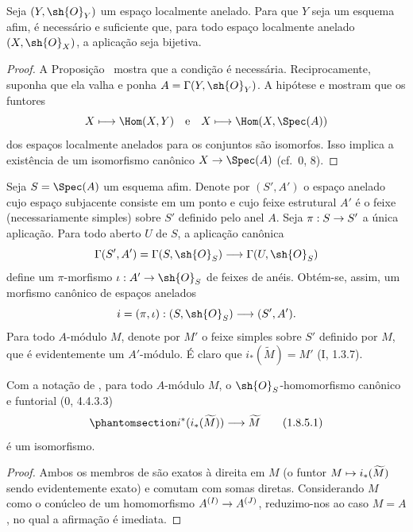 \documentclass[oneside,10pt]{amsart}
\makeatletter
\newcommand{\ega@arrow}[2]{\mathchoice{#1}{#2}{#2}{#2}}
\let\ega@shortmapsto\mapsto
\renewcommand{\to}{\ega@arrow{\longrightarrow}{\rightarrow}}
\renewcommand{\mapsto}{\ega@arrow{\longmapsto}{\ega@shortmapsto}}
\let\EGAOriginalLabel\label
\renewcommand{\label}[1]{\phantomsection\EGAOriginalLabel{#1}}
\makeatother
\begin{document}
\begin{corollary}[1.8.3]
\label{ega2:addendum:I.1.8.3}
Seja $(Y,\sh{O}_Y)$ um espaço localmente anelado. Para que $Y$ seja um
esquema afim, é necessário e suficiente que, para todo espaço
localmente anelado $(X,\sh{O}_X)$, a aplicação  seja
bijetiva.
\end{corollary}

\begin{proof}
A Proposição~ mostra que a condição é necessária.
Reciprocamente, suponha que ela valha e ponha $A=\Gamma(Y,\sh{O}_Y)$.
A hipótese e  mostram que os funtores
\[
  X\longmapsto\Hom(X,Y)
  \quad\hbox{e}\quad
  X\longmapsto\Hom(X,\Spec(A))
\]
dos espaços localmente anelados para os conjuntos são isomorfos. Isso
implica a existência de um isomorfismo canônico
$X\to\Spec(A)$ (cf.~0, 8).
\end{proof}

\begin{env}[1.8.4]
\label{ega2:addendum:I.1.8.4}
Seja $S=\Spec(A)$ um esquema afim. Denote por $(S',A')$ o espaço
anelado cujo espaço subjacente consiste em um ponto e cujo feixe
estrutural $A'$ é o feixe (necessariamente simples) sobre $S'$ definido
pelo anel $A$. Seja $\pi:S\to S'$ a única aplicação. Para todo aberto
$U$ de $S$, a aplicação canônica
\[
  \Gamma(S',A')=\Gamma(S,\sh{O}_S)\to\Gamma(U,\sh{O}_S)
\]
define um $\pi$-morfismo $\iota:A'\to\sh{O}_S$ de feixes de anéis.
Obtém-se, assim, um morfismo canônico de espaços anelados
\[
  i=(\pi,\iota):(S,\sh{O}_S)\to(S',A').
\]
Para todo $A$-módulo $M$, denote por $M'$ o feixe simples sobre $S'$
definido por $M$, que é evidentemente um $A'$-módulo. É claro que
$i_*(\widetilde M)=M'$ (I, 1.3.7).
\end{env}

\begin{lemma}[1.8.5]
\label{ega2:addendum:I.1.8.5}
Com a notação de , para todo $A$-módulo $M$, o
$\sh{O}_S$-homomorfismo canônico e funtorial (0, 4.4.3.3)
\begin{equation}
\label{ega2:addendum:I.1.8.5.1}
  i^*(i_*(\widetilde M))\to\widetilde M
\tag{1.8.5.1}
\end{equation}
é um isomorfismo.
\end{lemma}

\begin{proof}
Ambos os membros de  são exatos à direita em $M$ (o
funtor $M\mapsto i_*(\widetilde M)$ sendo evidentemente exato) e
comutam com somas diretas. Considerando $M$ como o conúcleo de um
homomorfismo $A^{(I)}\to A^{(J)}$, reduzimo-nos ao caso $M=A$, no qual
a afirmação é imediata.
\end{proof}
\end{document}
